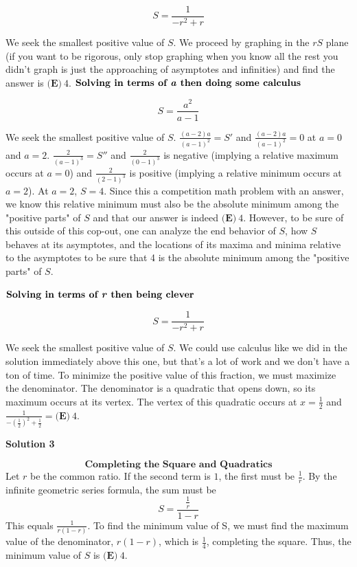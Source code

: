 \begin{enumerate}
 \[S=\frac{1}{-r^2+r}\]

 We seek the smallest positive value of $S$. We proceed by graphing in the $rS$ plane (if you want to be rigorous, only stop graphing when you know all the rest you didn't graph is just the approaching of asymptotes and infinities) and find the answer is $\boxed{\textbf{(E)}\ 4}.$
$\textbf{Solving in terms of \textit{a} then doing some calculus}$

 \[S=\frac{a^2}{a-1}\]

 We seek the smallest positive value of $S$. $\frac{(a-2)a}{(a-1)^2}=S'$ and $\frac{(a-2)a}{(a-1)^2}=0$ at $a=0$ and $a=2$. $\frac{2}{(a-1)^3}=S''$ and $\frac{2}{(0-1)^3}$ is negative (implying a relative maximum occurs at $a=0$) and $\frac{2}{(2-1)^3}$ is positive (implying a relative minimum occurs at $a=2$).  At $a=2$, $S=4$. Since this a competition math problem with an answer, we know this relative minimum must also be the absolute minimum among the "positive parts" of $S$ and that our answer is indeed $\boxed{\textbf{(E)}\ 4}.$ However, to be sure of this outside of this cop-out, one can analyze the end behavior of $S$, how $S$ behaves at its asymptotes, and the locations of its maxima and minima relative to the asymptotes to be sure that 4 is the absolute minimum among the "positive parts" of $S$.

 $\textbf{Solving in terms of \textit{r} then being clever}$

 \[S=\frac{1}{-r^2+r}\]

 We seek the smallest positive value of $S$. We could use calculus like we did in the solution immediately above this one, but that's a lot of work and we don't have a ton of time. To minimize the positive value of this fraction, we must maximize the denominator. The denominator is a quadratic that opens down, so its maximum occurs at its vertex. The vertex of this quadratic occurs at $x=\frac{1}{2}$ and $\frac{1}{-(\frac{1}{2})^2+\frac{1}{2}}=\boxed{\textbf{(E)}\ 4}$.

 



\textbf{Solution 3}


 \[\textbf{Completing the Square and Quadratics}\]Let $r$ be the common ratio. If the second term is $1$, the first must be $\frac{1}{r}$. By the infinite geometric series formula, the sum must be 
 \[S=\frac{\frac{1}{r}}{1-r}\] This equals $\frac{1}{r(1-r)}$. To find the minimum value of S, we must find the maximum value of the denominator, $r(1-r)$, which is $\frac{1}{4}$, completing the square. Thus, the minimum value of $S$ is $\boxed{\textbf{(E)}\ 4}$.


\end{enumerate}
